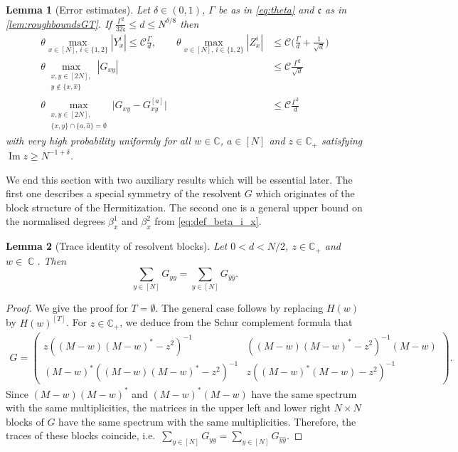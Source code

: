 \documentclass[11pt]{article}
\DeclareMathOperator{\Ima}{Im}
\DeclareMathOperator{\CC}{\mathbb{C}}
\newcommand{\C}{\mathbb{C}}
\renewcommand{\Im}{\Ima}
\theoremstyle{plain}
\newtheorem{lemma}{Lemma}[section]
\theoremstyle{remark}
\numberwithin{equation}{section}
\newcommand*\bset[1]{[#1]}
\newcommand*\ubarr[1]{{\widehat{#1}}}
\begin{document}
	\begin{lemma}[Error estimates] \label{lem:roughboundsrest}
		Let $\delta \in (0,1)$,  $\Gamma$ be as in \cref{eq:theta} and $\mathfrak c$ as in \cref{lem:roughboundsGT}.  
		If $\frac{\Gamma^2}{32\mathfrak c} \leq d \leq N^{\delta/8}$ then 
		\begin{align}
		\theta \max_{x \in [N],\, i\in \{1,2\}} \left|Y^{i}_{x}\right|  \le \mathcal{C}  \frac{\Gamma}{d}, \qquad 
		\theta \max_{x \in [N],\, i\in \{1,2\}} \left|Z^{i}_{x}\right| & \le \mathcal{C} \biggl( \frac{\Gamma}{d} + \frac{1}{\sqrt{d}} \biggr) \label{eq:boundrest}\\
			\theta \max_{\substack{x,y \in [2N],\\y\notin \{x,\ubarr{x}\}}} \left|G_{xy}\right| &\le  \mathcal{C}  \frac{\Gamma^2}{\sqrt{d}} \label{eq:roughboundGd-1/2}\\
			\theta \max_{\substack{x,y \in [2N],\\ \{x,y\}\cap \{a,\ubarr{a}\} =\emptyset }} \bigl|G_{xy} - G_{xy}^{\bset{a}}\bigr| &\le  \mathcal{C}\frac{\Gamma^3}{d} \label{eq:roughdifferenceGGTd-1}
		\end{align}
		with very high probability
		uniformly for all $w \in \C$, $a \in [N]$ and $z \in \C_+$ satisfying $\Im z \geq N^{-1+\delta}$. 
	\end{lemma}

	
	We end this section with two auxiliary results which will be essential later. 
	The first one describes a special symmetry of the resolvent $G$ which originates of the block structure of the Hermitization. 
	The second one is a general upper bound on the normalised degrees $\beta_x^1$ and $\beta_x^2$ from \cref{eq:def_beta_i_x}. 
	
	\begin{lemma}[Trace identity of resolvent blocks]\label{lem:traceg1=g2}
		Let $0< d < N/2$, $z \in \C_+$ and $w \in \CC$. 
		Then
		\begin{equation*}%
			\sum_{y\in [N]} G_{yy} = \sum_{y\in [N]} G_{\ubarr{y} \ubarr{y}}.
		\end{equation*}
	\end{lemma}
	
	\begin{proof}
		We give the proof for $T= \emptyset$. The general case follows by replacing $H(w)$ by $H(w)^{\bset{T}}$. For $z \in \C_+$, we deduce from the Schur complement formula that 
		\begin{align*}
			G 	= \begin{pmatrix} z((M-w)(M-w)^*-z^2)^{-1} & ((M-w)(M-w)^*-z^2)^{-1}(M-w) \\ 
			(M-w)^*((M-w)(M-w)^*-z^2)^{-1} 
			& z((M-w)^* (M-w)-z^2)^{-1} 
			\end{pmatrix} . 
		\end{align*}
		Since $\left(M - w \right)\left(M - w \right)^\ast$ and $\left(M - w \right)^\ast\left(M - w \right)$ have the same spectrum with the same multiplicities, the matrices in the upper left and lower right $N\times N$ blocks of $G$ have the same spectrum with the same multiplicities.
		Therefore, the traces of these blocks coincide, i.e.\ $\sum_{y \in [N]} G_{yy}  = \sum_{y \in [N]} G_{\ubarr{y}\ubarr{y}}$. 
	\end{proof}
	
\end{document}
